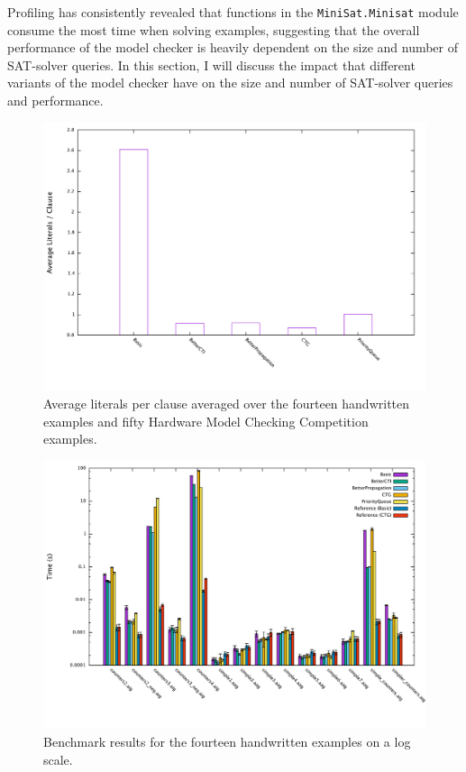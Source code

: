\documentclass[12pt,a4paper,twoside,openright]{report}
\begin{document}
{Profiling has consistently revealed that functions in the \verb,MiniSat.Minisat, module consume the most time
when solving examples, suggesting that the overall performance of the model checker is heavily dependent on
the size and number of SAT-solver queries. In this section, I will discuss the impact that different
variants of the model checker have on the size and number of SAT-solver queries and performance.

\begin{figure}[!ht]
\includegraphics[width=16cm]{litspercls.pdf}
\caption{Average literals per clause averaged over the fourteen handwritten examples and fifty Hardware
Model Checking Competition examples.}
\end{figure}

\begin{figure}[!ht]
\includegraphics[width=16cm]{handwritten.pdf}
\caption{Benchmark results for the fourteen handwritten examples on a log scale.}
\end{figure}

}
\end{document}

